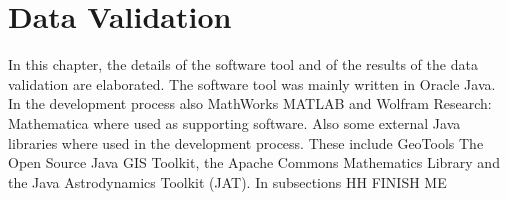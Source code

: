\chapter{Data Validation}
\label{chap:DataValidation}

In this chapter, the details of the software tool and of the results of the data validation are elaborated. The software tool was mainly written in Oracle Java. In the development process also MathWorks MATLAB and Wolfram Research: Mathematica where used as supporting software. Also some external Java libraries where used in the development process. These include GeoTools The Open Source Java GIS Toolkit, the Apache Commons Mathematics Library and the Java Astrodynamics Toolkit (JAT). In subsections HH FINISH ME
